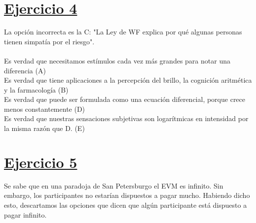 \documentclass{article}
\newcommand{\ulcolor}[2][Red]{\setulcolor{#1}\ul{#2}}
\begin{document}
    \section*{\ulcolor[Green]{Ejercicio 4}}
        La opción incorrecta es la C: "La Ley de WF explica por qué algunas personas tienen simpatía por el riesgo". \\
        \\
        Es verdad que necesitamos estímulos cada vez más grandes para notar una diferencia (A) \\
        Es verdad que tiene aplicaciones a la percepción del brillo, la cognición aritmética y la farmacología (B) \\
        Es verdad que puede ser formulada como una ecuación diferencial, porque crece menos constantemente (D) \\
        Es verdad que nuestras sensaciones subjetivas son logarítmicas en intensidad por la misma razón que D. (E)
    \section*{\ulcolor[Yellow]{Ejercicio 5}}
        Se sabe que en una paradoja de San Petersburgo el EVM es infinito. Sin embargo, los participantes no estarían dispuestos a pagar mucho. Habiendo dicho esto, descartamos las opciones que dicen que algún participante está dispuesto a pagar infinito.
        
\end{document}
